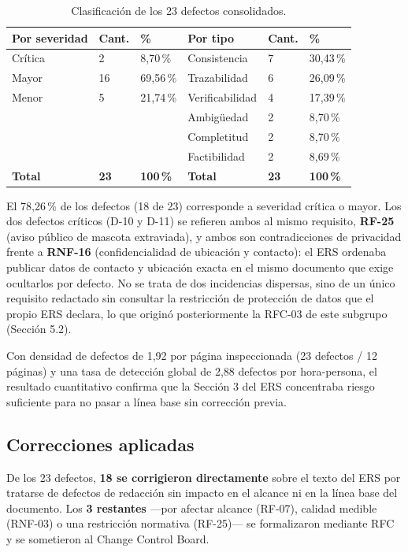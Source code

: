 \documentclass[journal,onecolumn]{IEEEtran}
\begin{document}
\begin{table}[H]
	\centering
	\caption{Clasificación de los 23 defectos consolidados.}
	\label{tab:clasificacion-defectos}
	\small
	\begin{tabular}{L{2.8cm} C{1.3cm} C{1.5cm} L{2.8cm} C{1.3cm} C{1.5cm}}
		\toprule
		\textbf{Por severidad} & \textbf{Cant.} & \textbf{\%} & \textbf{Por tipo} & \textbf{Cant.} & \textbf{\%} \\
		\midrule
		Crítica & 2 & 8,70\,\% & Consistencia & 7 & 30,43\,\% \\
		Mayor & 16 & 69,56\,\% & Trazabilidad & 6 & 26,09\,\% \\
		Menor & 5 & 21,74\,\% & Verificabilidad & 4 & 17,39\,\% \\
		& & & Ambigüedad & 2 & 8,70\,\% \\
		& & & Completitud & 2 & 8,70\,\% \\
		& & & Factibilidad & 2 & 8,69\,\% \\
		\midrule
		\textbf{Total} & \textbf{23} & \textbf{100\,\%} & \textbf{Total} & \textbf{23} & \textbf{100\,\%} \\
		\bottomrule
	\end{tabular}
\end{table}

El 78,26\,\% de los defectos (18 de 23) corresponde a severidad crítica o mayor. Los dos defectos críticos (D-10 y D-11) se refieren ambos al mismo requisito, \textbf{RF-25} (aviso público de mascota extraviada), y ambos son contradicciones de privacidad frente a \textbf{RNF-16} (confidencialidad de ubicación y contacto): el ERS ordenaba publicar datos de contacto y ubicación exacta en el mismo documento que exige ocultarlos por defecto. No se trata de dos incidencias dispersas, sino de un único requisito redactado sin consultar la restricción de protección de datos que el propio ERS declara, lo que originó posteriormente la RFC-03 de este subgrupo (Sección 5.2).

Con densidad de defectos de 1,92 por página inspeccionada (23 defectos / 12 páginas) y una tasa de detección global de 2,88 defectos por hora-persona, el resultado cuantitativo confirma que la Sección 3 del ERS concentraba riesgo suficiente para no pasar a línea base sin corrección previa.

\subsection{Correcciones aplicadas}

De los 23 defectos, \textbf{18 se corrigieron directamente} sobre el texto del ERS por tratarse de defectos de redacción sin impacto en el alcance ni en la línea base del documento. Los \textbf{3 restantes} ---por afectar alcance (RF-07), calidad medible (RNF-03) o una restricción normativa (RF-25)--- se formalizaron mediante RFC y se sometieron al Change Control Board.
\end{document}
